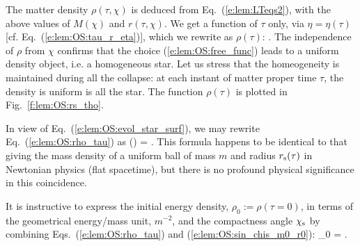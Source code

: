 The matter density $\rho(\tau,\chi)$ is deduced from Eq.~(\ref{e:lem:LTeqs2}), with the above
values of $M(\chi)$ and $r(\tau,\chi)$. We get a function of $\tau$ only,
via $\eta = \eta(\tau)$ [cf. Eq.~(\ref{e:lem:OS:tau_r_eta})],
which we rewrite as $\rho(\tau)$:
\be \label{e:lem:OS:rho_tau}
   .
\ee
The independence of $\rho$ from $\chi$ confirms that the choice
(\ref{e:lem:OS:free_func}) leads to a uniform density object, i.e.
a homogeneous star.
Let us stress that the homeogeneity is maintained during all the collapse:
at each instant of matter proper time $\tau$, the density is uniform is all the star.
The function $\rho(\tau)$ is plotted in Fig.~\ref{f:lem:OS:rs_tho}.
\begin{remark}
In view of Eq.~(\ref{e:lem:OS:evol_star_surf}), we may rewrite Eq.~(\ref{e:lem:OS:rho_tau})
as
\be \label{e:lem:OS:rho_m0_r_tau}
    \rho(\tau) =  .
\ee
This formula happens to be identical to that giving the mass density of a uniform ball of mass
$m$ and radius $r_{\rm s}(\tau)$ in Newtonian physics (flat spacetime), but there is
no profound physical significance in this coincidence.
\end{remark}

It is instructive to express the initial energy density, $\rho_0 := \rho(\tau=0)$,
in terms of the geometrical energy/mass unit, $m^{-2}$, and the compactness
angle $\chi_{\rm s}$ by combining Eqs.~(\ref{e:lem:OS:rho_tau}) and
(\ref{e:lem:OS:sin_chis_m0_r0}):
\be \label{e:lem:OS:rho0}
    \rho_0 =  .
\ee

